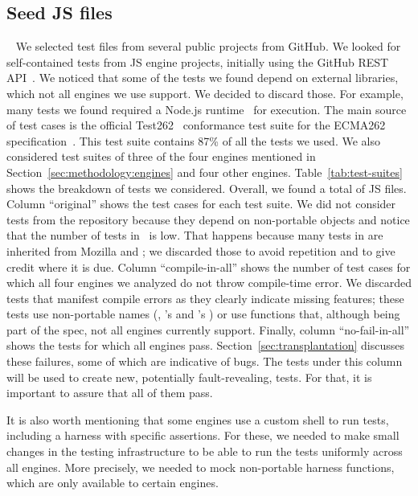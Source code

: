 \documentclass[10pt,conference,anonymous]{IEEEtran}
\begin{document}
\subsection{Seed JS files\label{sec:seeds}}~
We selected test files from several public projects from GitHub. We
looked for self-contained tests from JS engine projects, initially
using the GitHub REST API~\cite{github-rest-api}. We noticed that some
of the tests we found depend on external libraries, which not all
engines we use support. We decided to discard those. For example, many
tests we found required a Node.js runtime~\cite{node} for
execution. The main source of test cases is the official
Test262~\cite{tc39-github} conformance test suite for the ECMA262
specification~\cite{ecmas262-spec}. This test suite contains 87\% of
all the tests we used. We also considered test suites of three of the
four engines mentioned in Section~\ref{sec:methodology:engines} and
four other engines. Table~\ref{tab:test-suites} shows the breakdown of
tests we considered. Overall, we found a total of \totfiles{} JS
files. Column ``original'' shows the test cases for each
test suite. We did not consider tests from the \chakra{} repository because they depend
on non-portable objects and notice that the number of tests in
\veight\ is low. That happens because many tests in \veight{} are
inherited from Mozilla and \jsc{}; we discarded those to avoid
repetition and to give credit where it is due. Column
``compile-in-all'' shows the number of test cases for which all four
engines we analyzed do not throw compile-time error. We discarded
tests that manifest compile errors as they clearly indicate missing
features; these tests use non-portable names (\eg{}, \jsc{}'s
 and \smonkey{}'s )
or use functions that, although being part of the spec, not all
engines currently support. Finally, column ``no-fail-in-all'' shows
the tests for which all engines
pass. Section~\ref{sec:transplantation} discusses these failures, some
of which are indicative of bugs. The tests under this column will be
used to create new, potentially fault-revealing, tests. For that, it
is important to assure that all of them pass.

It is also worth mentioning that some engines use a custom shell to
run tests, including a harness with specific assertions.  For these,
we needed to make small changes in the testing infrastructure to be
able to run the tests uniformly across all engines. More precisely, we
needed to mock non-portable harness functions, which are only
available to certain engines.
\end{document}
